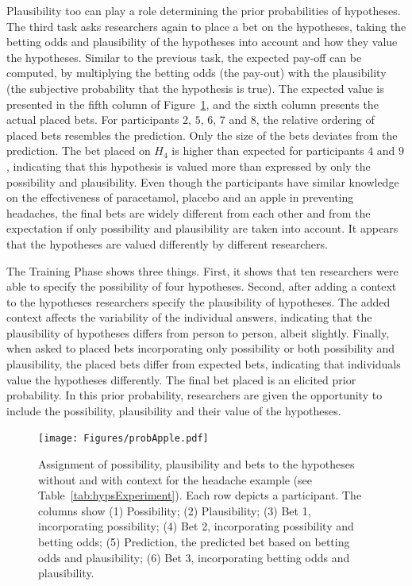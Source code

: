\documentclass[man]{apa6}
\begin{document}
Plausibility too can play a role determining the prior probabilities of hypotheses.
The third task asks researchers again to place a bet on the hypotheses, taking the betting odds and plausibility of the hypotheses into account and how they value the hypotheses.
Similar to the previous task, the expected pay-off can be computed, by multiplying the betting odds (the pay-out) with the plausibility (the subjective probability that the hypothesis is true).
The expected value is presented in the fifth column of Figure~\ref{fig:probapple}, and the sixth column presents the actual placed bets.
For participants $2$, $5$, $6$, $7$ and $8$, the relative ordering of placed bets resembles the prediction.
Only the size of the bets deviates from the prediction.
The bet placed on $H_4$ is higher than expected for participants $4$ and $9$, indicating that this hypothesis is valued more than expressed by only the possibility and plausibility.
Even though the participants have similar knowledge on the effectiveness of paracetamol, placebo and an apple in preventing headaches, the final bets are widely different from each other and from the expectation if only possibility and plausibility are taken into account.
It appears that the hypotheses are valued differently by different researchers.

The Training Phase shows three things.
First, it shows that ten researchers were able to specify the possibility of four hypotheses.
Second, after adding a context to the hypotheses researchers specify the plausibility of hypotheses.
The added context affects the variability of the individual answers, indicating that the plausibility of hypotheses differs from person to person, albeit slightly.
Finally, when asked to placed bets incorporating only possibility or both possibility and plausibility, the placed bets differ from expected bets, indicating that individuals value the hypotheses differently.
The final bet placed is an elicited prior probability.
In this prior probability, researchers are given the opportunity to include the possibility, plausibility and their value of the hypotheses.


\begin{figure}
	\texttt{[image: Figures/probApple.pdf]}
	\caption{Assignment of possibility, plausibility and bets to the hypotheses without and with context for the headache example (see Table~\ref{tab:hypsExperiment}). Each row depicts a participant. The columns show (1) Possibility; (2) Plausibility; (3) Bet 1, incorporating possibility; (4) Bet 2, incorporating possibility and betting odds; (5) Prediction, the predicted bet based on betting odds and plausibility; (6) Bet 3, incorporating betting odds and plausibility.}
	\label{fig:probapple}
\end{figure}
\end{document}
